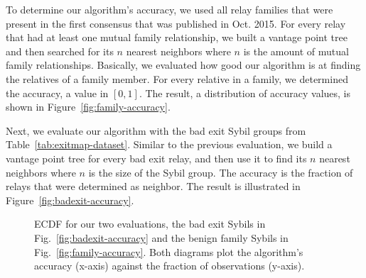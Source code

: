To determine our algorithm's accuracy, we used all relay families that were
present in the first consensus that was published in Oct. 2015.  For every relay
that had at least one mutual family relationship, we built a vantage point tree and then
searched for its $n$ nearest neighbors where $n$ is the amount of mutual family
relationships.  Basically, we evaluated how good our algorithm is at finding the
relatives of a family member.  For every relative in a family, we determined the
accuracy, a value in $[0,1]$.  The result, a distribution of accuracy values, is
shown in Figure~\ref{fig:family-accuracy}.

Next, we evaluate our algorithm with the bad exit Sybil groups from
Table~\ref{tab:exitmap-dataset}.  Similar to the previous evaluation, we build a
vantage point tree for every bad exit relay, and then use it to find its $n$
nearest neighbors where $n$ is the size of the Sybil group.  The accuracy is the
fraction of relays that were determined as neighbor.  The result is illustrated
in Figure~\ref{fig:badexit-accuracy}.

\begin{figure}
\centering
{}
\caption{ECDF for our two evaluations, the bad exit Sybils
	in Fig.~\ref{fig:badexit-accuracy} and the benign family Sybils
	in Fig.~\ref{fig:family-accuracy}.  Both diagrams plot the algorithm's
accuracy (x-axis) against the fraction of observations (y-axis).}
\label{fig:accuracy}
\end{figure}


